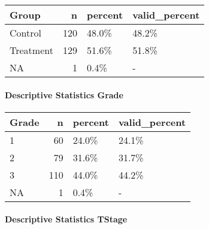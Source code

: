 \documentclass[
]{article}
\newenvironment{Shaded}{\begin{snugshade}}{\end{snugshade}}
\newcommand{\DataTypeTok}[1]{\textcolor[rgb]{0.00,0.34,0.68}{#1}}
\newcommand{\DecValTok}[1]{\textcolor[rgb]{0.69,0.50,0.00}{#1}}
\newcommand{\KeywordTok}[1]{\textcolor[rgb]{0.12,0.11,0.11}{\textbf{#1}}}
\newcommand{\NormalTok}[1]{\textcolor[rgb]{0.12,0.11,0.11}{#1}}
\newcommand{\OperatorTok}[1]{\textcolor[rgb]{0.12,0.11,0.11}{#1}}
\newcommand{\StringTok}[1]{\textcolor[rgb]{0.75,0.01,0.01}{#1}}
\begin{document}
\begin{longtable}[]{@{}lrll@{}}
\toprule
Group & n & percent & valid\_percent\tabularnewline
\midrule
\endhead
Control & 120 & 48.0\% & 48.2\%\tabularnewline
Treatment & 129 & 51.6\% & 51.8\%\tabularnewline
NA & 1 & 0.4\% & -\tabularnewline
\bottomrule
\end{longtable}

\pagebreak

\hypertarget{descriptive-statistics-grade}{%
\paragraph{Descriptive Statistics
Grade}\label{descriptive-statistics-grade}}

\begin{Shaded}
\end{Shaded}

\begin{longtable}[]{@{}lrll@{}}
\toprule
Grade & n & percent & valid\_percent\tabularnewline
\midrule
\endhead
1 & 60 & 24.0\% & 24.1\%\tabularnewline
2 & 79 & 31.6\% & 31.7\%\tabularnewline
3 & 110 & 44.0\% & 44.2\%\tabularnewline
NA & 1 & 0.4\% & -\tabularnewline
\bottomrule
\end{longtable}

\pagebreak

\hypertarget{descriptive-statistics-tstage}{%
\paragraph{Descriptive Statistics
TStage}\label{descriptive-statistics-tstage}}

\begin{Shaded}
\end{Shaded}
\end{document}
